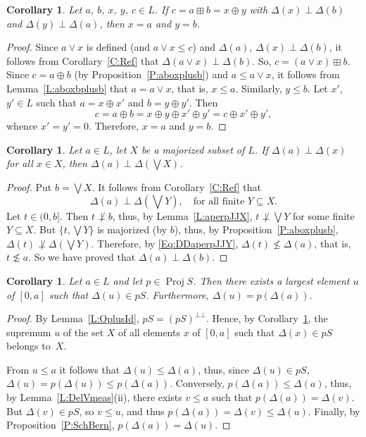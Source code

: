 \documentclass[psamsfonts,reqno]{memo-l}
\theoremstyle{plain}
\newtheorem{corollary}[lemma]{Corollary}
\theoremstyle{definition}
\theoremstyle{remark}
\numberwithin{equation}{section}
\DeclareMathOperator{\BB}{Proj}
\newcommand{\DD}{\Delta}
\newcommand{\set}[1]{\{#1\}}
\begin{document}
\begin{corollary}\label{C:aboxplusb}
Let $a$, $b$, $x$, $y$, $c\in L$. If $c=a\boxplus b=x\oplus y$ with
$\DD(x)\perp\DD(b)$ and $\DD(y)\perp\DD(a)$, then $x=a$ and $y=b$.
\end{corollary}

\begin{proof}
Since $a\vee x$ is defined (and $a\vee x\leq c$) and $\DD(a)$,
$\DD(x)\perp\DD(b)$, it follows from Corollary~\ref{C:Ref} that
$\DD(a\vee x)\perp\DD(b)$. So, $c=(a\vee x)\boxplus b$.
Since $c=a\oplus b$ (by Proposition~\ref{P:aboxplusb}) and $a\leq a\vee x$,
it follows from Lemma~\ref{L:aboxbplusb} that $a=a\vee x$, that is, $x\leq a$.
Similarly, $y\leq b$. Let $x'$, $y'\in L$ such that $a=x\oplus x'$ and
$b=y\oplus y'$. Then
   \[
   c=a\oplus b=x\oplus y\oplus x'\oplus y'=c\oplus x'\oplus y',
   \]
whence $x'=y'=0$. Therefore, $x=a$ and $y=b$.
\end{proof}

\begin{corollary}\label{C:DelPerp}
Let $a\in L$, let $X$ be a majorized subset of $L$.
If $\DD(a)\perp\DD(x)$ for all $x\in X$, then $\DD(a)\perp\DD(\bigvee X)$.
\end{corollary}

\begin{proof}
Put $b=\bigvee X$. It follows from Corollary~\ref{C:Ref} that
   \begin{equation}\label{Eq:DDaperpJJY}
   \DD(a)\perp\DD\left(\bigvee Y\right),\quad\text{for all finite }Y\subseteq X.
   \end{equation}
Let $t\in(0,b]$. Then $t\not\perp b$, thus, by Lemma~\ref{L:aperpJJX},
$t\not\perp\bigvee Y$ for some finite $Y\subseteq X$. But $\set{t,\bigvee Y}$
is majorized (by $b$), thus, by Proposition~\ref{P:aboxplusb},
$\DD(t)\not\perp\DD(\bigvee Y)$. Therefore, by \eqref{Eq:DDaperpJJY},
$\DD(t)\nleq\DD(a)$, that is, $t\not\lesssim a$. So we have proved that
$\DD(a)\perp\DD(b)$.
\end{proof}

\begin{corollary}\label{C:ProjOnL}
Let $a\in L$ and let \index{pzzroj@$\BB{S}$}$p\in\BB{S}$. Then there exists
a largest element $u$ of
$[0,a]$ such that $\DD(u)\in pS$. Furthermore, $\DD(u)=p(\DD(a))$.
\end{corollary}

\begin{proof}
By Lemma~\ref{L:OplusId}, $pS=(pS)^{\bot\bot}$. Hence, by
Corollary~\ref{C:DelPerp}, the supremum $u$ of the set $X$ of all elements
$x$ of $[0,a]$ such that $\DD(x)\in pS$ belongs to~$X$.

{}From $u\leq a$ it follows that $\DD(u)\leq\DD(a)$, thus, since
$\DD(u)\in pS$,
$\DD(u)=p(\DD(u))\leq p(\DD(a))$. Conversely, $p(\DD(a))\leq\DD(a)$, thus,
by Lemma~\ref{L:DelVmeas}(ii),
there exists $v\leq a$ such that $p(\DD(a))=\DD(v)$. But $\DD(v)\in pS$, so
$v\leq u$, and thus $p(\DD(a))=\DD(v)\leq\DD(u)$. Finally, by
Proposition~\ref{P:SchBern}, $p(\DD(a))=\DD(u)$.
\end{proof}
\end{document}
